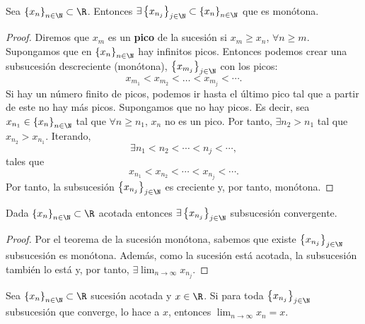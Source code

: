 \begin{ftheorem}
	\normalfont Sea $\displaystyle \left\{ x_{n}\right\} _{n\in\N}\subset\R $. Entonces $\displaystyle \exists \left\{ x_{n_{j}}\right\}_{j\in\N}\subset \left\{ x_{n}\right\} _{n\in\N} $ que es monótona.
\end{ftheorem}

\begin{proof}
	Diremos que $\displaystyle x_{m} $ es un \textbf{pico} de la sucesión si $\displaystyle x_{m} \geq x_{n} $, $\displaystyle \forall n \geq m $. Supongamos que en $\displaystyle \left\{ x_{n}\right\} _{n\in\N} $ hay infinitos picos. Entonces podemos crear una subsucesión descreciente (monótona), $\displaystyle \left\{ x_{m_{j}}\right\} _{j\in\N} $ con los picos:
	\[x_{m_{1}} < x_{m_{2}} < \ldots < x_{m_{j}} < \cdots .\]
	Si hay un número finito de picos, podemos ir hasta el último pico tal que a partir de este no hay más picos. Supongamos que no hay picos. Es decir, sea $\displaystyle x_{n_{1}} \in \left\{ x_{n}\right\} _{n\in\N} $ tal que $\displaystyle \forall n \geq n_{1} $, $\displaystyle x_{n} $ no es un pico. Por tanto, $\displaystyle \exists n_{2} > n_{1} $ tal que $\displaystyle x_{n_{2}} > x_{n_{1}} $. Iterando, 
	\[\exists n_{1} < n_{2} < \cdots < n_{j} < \cdots, \]
tales que
\[x_{n_{1}} < x_{n_{2}} < \cdots < x_{n_{j}} < \cdots .\]
Por tanto, la subsucesión $\displaystyle \left\{ x_{n_{j}}\right\} _{j\in\N} $ es creciente y, por tanto, monótona. 
\end{proof}

\begin{ftheorem}
	\normalfont Dada $\displaystyle \left\{ x_{n}\right\} _{n\in\N}\subset\R $ acotada entonces $\displaystyle \exists \left\{ x_{n_{j}}\right\} _{j\in\N} $ subsucesión convergente.
\end{ftheorem}

\begin{proof}
	Por el teorema de la sucesión monótona, sabemos que existe $\displaystyle \left\{ x_{n_{j}}\right\} _{j\in\N} $ subsucesión es monótona. Además, como la sucesión está acotada, la subsucesión también lo está y, por tanto, $\displaystyle \exists \lim_{n \to \infty}x_{n_{j}} $.
\end{proof}

\begin{ftheorem}[]
	\normalfont Sea $\displaystyle \left\{ x_{n}\right\} _{n\in\N}\subset\R $ sucesión acotada y $\displaystyle x \in \R $. Si para toda $\displaystyle \left\{ x_{n_{j}}\right\} _{j\in\N} $ subsucesión que converge, lo hace a $\displaystyle x $, entonces $\displaystyle \lim_{n \to \infty}x_{n} = x $.
\end{ftheorem}

